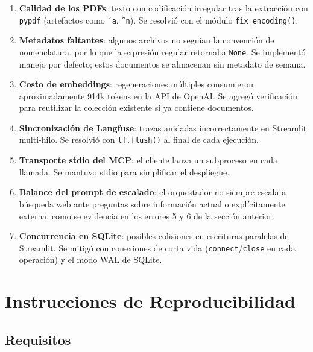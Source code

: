 \documentclass[conference]{IEEEtran}
\begin{document}
\begin{enumerate}
    \item \textbf{Calidad de los PDFs}: texto con codificación irregular tras la extracción con \texttt{pypdf} (artefactos como \texttt{´a}, \texttt{˜n}). Se resolvió con el módulo \texttt{fix\_encoding()}.

    \item \textbf{Metadatos faltantes}: algunos archivos no seguían la convención de nomenclatura, por lo que la expresión regular retornaba \texttt{None}. Se implementó manejo por defecto; estos documentos se almacenan sin metadato de semana.

    \item \textbf{Costo de embeddings}: regeneraciones múltiples consumieron aproximadamente 914k tokens en la API de OpenAI. Se agregó verificación para reutilizar la colección existente si ya contiene documentos.

    \item \textbf{Sincronización de Langfuse}: trazas anidadas incorrectamente en Streamlit multi-hilo. Se resolvió con \texttt{lf.flush()} al final de cada ejecución.

    \item \textbf{Transporte stdio del MCP}: el cliente lanza un subproceso en cada llamada. Se mantuvo stdio para simplificar el despliegue.

    \item \textbf{Balance del prompt de escalado}: el orquestador no siempre escala a búsqueda web ante preguntas sobre información actual o explícitamente externa, como se evidencia en los errores 5 y 6 de la sección anterior.

    \item \textbf{Concurrencia en SQLite}: posibles colisiones en escrituras paralelas de Streamlit. Se mitigó con conexiones de corta vida (\texttt{connect}/\texttt{close} en cada operación) y el modo WAL de SQLite.
\end{enumerate}

\section{Instrucciones de Reproducibilidad}

\subsection{Requisitos}
\end{document}
